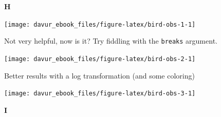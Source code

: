 \documentclass[]{book}
\newenvironment{Shaded}{\begin{snugshade}}{\end{snugshade}}
\newcommand{\DataTypeTok}[1]{\textcolor[rgb]{0.13,0.29,0.53}{#1}}
\newcommand{\KeywordTok}[1]{\textcolor[rgb]{0.13,0.29,0.53}{\textbf{#1}}}
\newcommand{\NormalTok}[1]{#1}
\newcommand{\OperatorTok}[1]{\textcolor[rgb]{0.81,0.36,0.00}{\textbf{#1}}}
\newcommand{\StringTok}[1]{\textcolor[rgb]{0.31,0.60,0.02}{#1}}
\begin{document}
\textbf{H}

\begin{Shaded}
\end{Shaded}

\begin{center}\texttt{[image: davur\_ebook\_files/figure-latex/bird-obs-1-1]} \end{center}

Not very helpful, now is it? Try fiddling with the \texttt{breaks} argument.

\begin{Shaded}
\end{Shaded}

\begin{center}\texttt{[image: davur\_ebook\_files/figure-latex/bird-obs-2-1]} \end{center}

Better results with a log transformation (and some coloring)

\begin{Shaded}
\end{Shaded}

\begin{center}\texttt{[image: davur\_ebook\_files/figure-latex/bird-obs-3-1]} \end{center}

\textbf{I}
\end{document}
